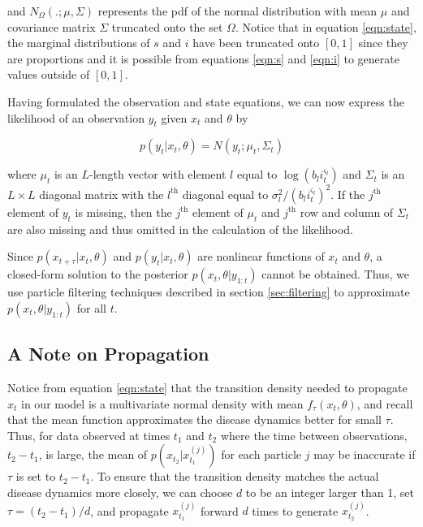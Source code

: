 \documentclass{elsarticle}
\begin{document}
\noindent and $N_{\Omega}(.;\mu,\Sigma)$ represents the pdf of the normal distribution with mean $\mu$ and covariance matrix $\Sigma$ truncated onto the set $\Omega$.  Notice that in equation \eqref{eqn:state}, the marginal distributions of $s$ and $i$ have been truncated onto $[0,1]$ since they are proportions and it is possible from equations \eqref{eqn:s} and \eqref{eqn:i} to generate values outside of $[0,1]$.

Having formulated the observation and state equations, we can now express the likelihood of an observation $y_t$ given $x_t$ and $\theta$ by

\begin{equation}
p\left(y_t\left|x_t,\theta\right.\right) = N\left(y_t;\mu_t,\Sigma_t\right) \label{eqn:lik}
\end{equation}

\noindent where $\mu_t$ is an $L$-length vector with element $l$ equal to $\log(b_li_t^{\varsigma_l})$ and $\Sigma_t$ is an $L \times L$ diagonal matrix with the $l^{\mbox{th}}$ diagonal equal to $\sigma_l^2 / (b_li_t^{\varsigma_l})^2$.  If the $j^{\mbox{th}}$ element of $y_t$ is missing, then the $j^{\mbox{th}}$ element of $\mu_t$ and $j^{\mbox{th}}$ row and column of $\Sigma_t$ are also missing and thus omitted in the calculation of the likelihood.

Since $p(x_{t+\tau}|x_t,\theta)$ and $p(y_t|x_t,\theta)$ are nonlinear functions of $x_t$ and $\theta$, a closed-form solution to the posterior $p(x_t,\theta|y_{1:t})$ cannot be obtained.  Thus, we use particle filtering techniques described in section \ref{sec:filtering} to approximate $p(x_t,\theta|y_{1:t})$ for all $t$.

\subsection{A Note on Propagation}

Notice from equation \eqref{eqn:state} that the transition density needed to propagate $x_t$ in our model is a multivariate normal density with mean $f_\tau(x_t,\theta)$, and recall that the mean function approximates the disease dynamics better for small $\tau$.  Thus, for data observed at times $t_1$ and $t_2$ where the time between observations, $t_2 - t_1$, is large, the mean of $p(x_{t_2}|x_{t_1}^{(j)})$ for each particle $j$ may be inaccurate if $\tau$ is set to $t_2 - t_1$.  To ensure that the transition density matches the actual disease dynamics more closely, we can choose $d$ to be an integer larger than 1, set $\tau = (t_2 - t_1) / d$, and propagate $x_{t_1}^{(j)}$ forward $d$ times to generate $x_{t_2}^{(j)}$.
\end{document}
